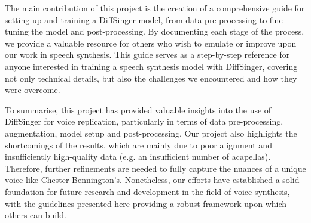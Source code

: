 \documentclass[a4paper]{article}
\begin{document}
	The main contribution of this project is the creation of a comprehensive guide for setting up and training a DiffSinger model, from data pre-processing to fine-tuning the model and post-processing. By documenting each stage of the process, we provide a valuable resource for others who wish to emulate or improve upon our work in speech synthesis. This guide serves as a step-by-step reference for anyone interested in training a speech synthesis model with DiffSinger, covering not only technical details, but also the challenges we encountered and how they were overcome.
	
	
	To summarise, this project has provided valuable insights into the use of DiffSinger for voice replication, particularly in terms of data pre-processing, augmentation, model setup and post-processing. Our project also highlights the shortcomings of the results, which are mainly due to poor alignment and insufficiently high-quality data (e.g. an insufficient number of acapellas).  Therefore, further refinements are needed to fully capture the nuances of a unique voice like Chester Bennington's. Nonetheless, our efforts have established a solid foundation for future research and development in the field of voice synthesis, with the guidelines presented here providing a robust framework upon which others can build.
	
	
	\newpage
	
	
	
\end{document}
